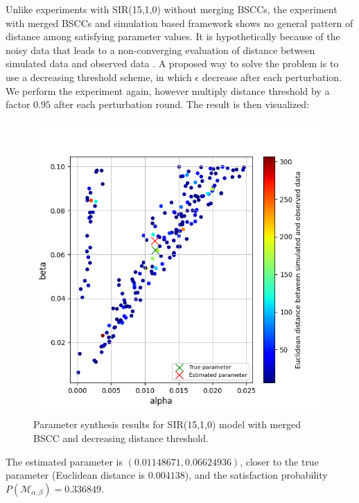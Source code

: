 Unlike experiments with SIR(15,1,0) without merging BSCCs, the experiment with merged BSCCs and
simulation based framework shows no general pattern of distance among satisfying parameter values.
It is hypothetically because of the noisy data that leads to a non-converging evaluation of distance
between simulated data and observed data \cite{sisson2007sequential}. A proposed way to solve the
problem is to use a decreasing threshold scheme, in which $\epsilon$ decrease after each
perturbation. We perform the experiment again, however multiply distance threshold by a factor
$0.95$ after each perturbation round. The result is then visualized:
\begin{figure}[H]
    \centering
    \includegraphics[width=0.5\linewidth]{figures/sir1510_merged_bscc_abcsmc_mod.png}
    \caption{Parameter synthesis results for SIR(15,1,0) model with merged BSCC and decreasing distance threshold.}
\end{figure}
The estimated parameter is $(0.01148671, 0.06624936)$, closer to the true parameter (Euclidean
distance is $0.004138$), and the satisfaction probability $P(\mathcal{M}_{\alpha,\beta}) = 0.336849$.

